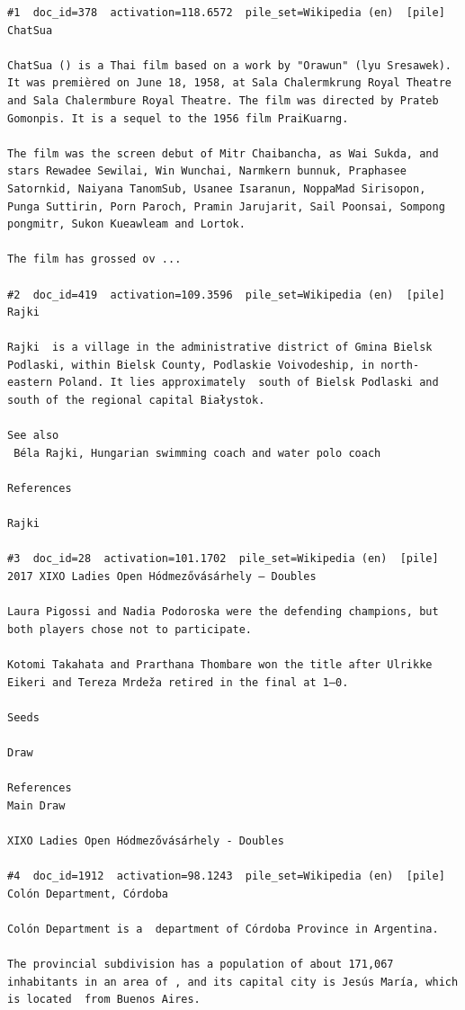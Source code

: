 \begin{verbatim}
#1  doc_id=378  activation=118.6572  pile_set=Wikipedia (en)  [pile]
ChatSua

ChatSua () is a Thai film based on a work by "Orawun" (lyu Sresawek). It was premièred on June 18, 1958, at Sala Chalermkrung Royal Theatre and Sala Chalermbure Royal Theatre. The film was directed by Prateb Gomonpis. It is a sequel to the 1956 film PraiKuarng.

The film was the screen debut of Mitr Chaibancha, as Wai Sukda, and stars Rewadee Sewilai, Win Wunchai, Narmkern bunnuk, Praphasee Satornkid, Naiyana TanomSub, Usanee Isaranun, NoppaMad Sirisopon, Punga Suttirin, Porn Paroch, Pramin Jarujarit, Sail Poonsai, Sompong pongmitr, Sukon Kueawleam and Lortok.

The film has grossed ov ...

#2  doc_id=419  activation=109.3596  pile_set=Wikipedia (en)  [pile]
Rajki

Rajki  is a village in the administrative district of Gmina Bielsk Podlaski, within Bielsk County, Podlaskie Voivodeship, in north-eastern Poland. It lies approximately  south of Bielsk Podlaski and  south of the regional capital Białystok.

See also
 Béla Rajki, Hungarian swimming coach and water polo coach

References

Rajki

#3  doc_id=28  activation=101.1702  pile_set=Wikipedia (en)  [pile]
2017 XIXO Ladies Open Hódmezővásárhely – Doubles

Laura Pigossi and Nadia Podoroska were the defending champions, but both players chose not to participate.

Kotomi Takahata and Prarthana Thombare won the title after Ulrikke Eikeri and Tereza Mrdeža retired in the final at 1–0.

Seeds

Draw

References
Main Draw

XIXO Ladies Open Hódmezővásárhely - Doubles

#4  doc_id=1912  activation=98.1243  pile_set=Wikipedia (en)  [pile]
Colón Department, Córdoba

Colón Department is a  department of Córdoba Province in Argentina.

The provincial subdivision has a population of about 171,067 inhabitants in an area of , and its capital city is Jesús María, which is located  from Buenos Aires.


\end{verbatim}
